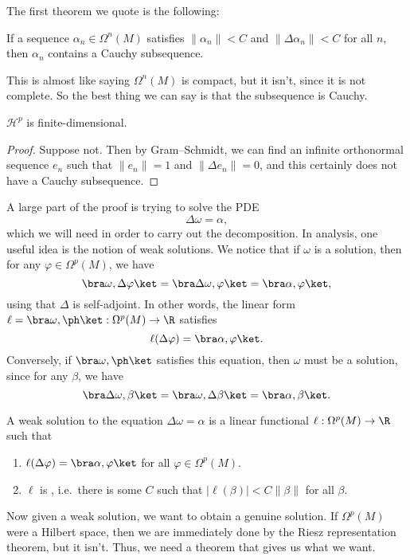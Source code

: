 \documentclass[a4paper]{article}
\begin{document}
The first theorem we quote is the following:
\begin{thm}
  If a sequence $\alpha_n \in \Omega^n(M)$ satisfies $\|\alpha_n\| < C$ and $\|\Delta \alpha_n\| < C$ for all $n$, then $\alpha_n$ contains a Cauchy subsequence.
\end{thm}
This is almost like saying $\Omega^n(M)$ is compact, but it isn't, since it is not complete. So the best thing we can say is that the subsequence is Cauchy.

\begin{cor}
  $\mathcal{H}^p$ is finite-dimensional.
\end{cor}

\begin{proof}
  Suppose not. Then by Gram--Schmidt, we can find an infinite orthonormal sequence $e_n$ such that $\|e_n\| = 1$ and $\|\Delta e_n\| = 0$, and this certainly does not have a Cauchy subsequence.
\end{proof}

A large part of the proof is trying to solve the PDE
\[
  \Delta \omega = \alpha,
\]
which we will need in order to carry out the decomposition. In analysis, one useful idea is the notion of weak solutions. We notice that if $\omega$ is a solution, then for any $\varphi \in \Omega^p(M)$, we have
\[
  \bra \omega, \Delta\varphi\ket = \bra \Delta \omega, \varphi\ket = \bra \alpha, \varphi\ket,
\]
using that $\Delta$ is self-adjoint. In other words, the linear form $\ell = \bra \omega, \ph\ket: \Omega^p(M) \to \R$ satisfies
\[
  \ell(\Delta \varphi) = \bra \alpha, \varphi\ket.
\]
Conversely, if $\bra \omega, \ph\ket$ satisfies this equation, then $\omega$ must be a solution, since for any $\beta$, we have
\[
  \bra \Delta \omega, \beta\ket = \bra \omega, \Delta \beta\ket = \bra \alpha, \beta\ket.
\]
\begin{defi}
  A weak solution to the equation $\Delta \omega = \alpha$ is a linear functional $\ell: \Omega^p(M) \to \R$ such that
  \begin{enumerate}
    \item $\ell(\Delta \varphi) = \bra \alpha, \varphi\ket$ for all $\varphi \in \Omega^p(M)$.
    \item $\ell$ is , i.e.\ there is some $C$ such that $|\ell (\beta)| < C \|\beta\|$ for all $\beta$.
  \end{enumerate}
\end{defi}
Now given a weak solution, we want to obtain a genuine solution. If $\Omega^p(M)$ were a Hilbert space, then we are immediately done by the Riesz representation theorem, but it isn't. Thus, we need a theorem that gives us what we want.
\end{document}
